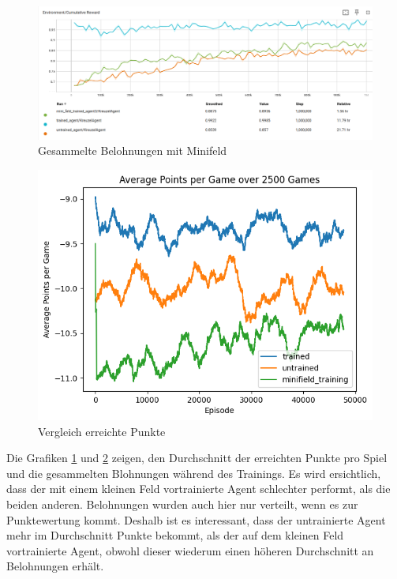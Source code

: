 \begin{figure}[!h]
    \centering
    \includegraphics[scale=0.3]{Bilder/rewards_minifield.png}
    \caption{Gesammelte Belohnungen mit Minifeld}
    \label{fig:Minifeld_rewards}
\end{figure}

\begin{figure}[!h]
    \centering
    \includegraphics[scale=0.5]{Bilder/points_minifeld.png}
    \caption{Vergleich erreichte Punkte}
    \label{fig:Minifeld_points}
\end{figure}

Die Grafiken \ref{fig:Minifeld_rewards} und \ref{fig:Minifeld_points} zeigen, den Durchschnitt der erreichten Punkte pro Spiel und die gesammelten Blohnungen während des Trainings.
Es wird ersichtlich, dass der mit einem kleinen Feld vortrainierte Agent schlechter performt, als die beiden anderen. Belohnungen wurden auch hier nur verteilt, wenn es zur Punktewertung kommt. Deshalb ist es interessant, dass der untrainierte Agent mehr im Durchschnitt Punkte bekommt, als der auf dem kleinen Feld vortrainierte Agent, obwohl dieser wiederum einen höheren Durchschnitt an Belohnungen erhält. 


